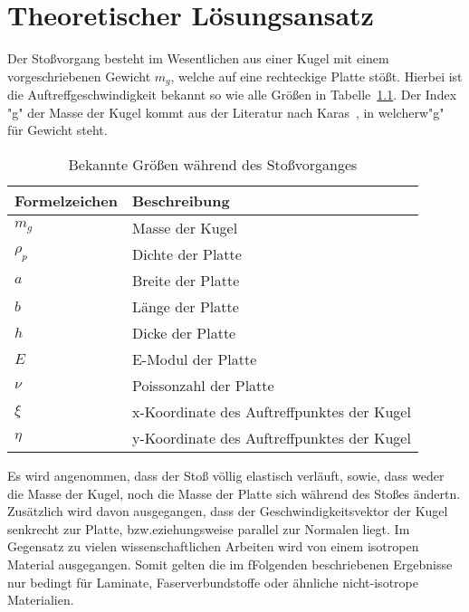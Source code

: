 \chapter{Theoretischer Lösungsansatz}
\label{chap:Principles}

Der Stoßvorgang besteht im Wesentlichen aus einer Kugel mit einem vorgeschriebenen Gewicht $m_g$, welche auf eine rechteckige Platte stößt. Hierbei ist die Auftreffgeschwindigkeit bekannt so wie alle Größen in Tabelle~\ref{tab:TheorieVariablen}. Der Index "g" der Masse der Kugel kommt aus der Literatur nach Karas~\cite{Karas.1939}, in welcherw"g" für Gewicht steht. 

\begin{table}[h!]
	\begin{center}
		\caption{Bekannte Größen während des Stoßvorganges}
		\label{tab:TheorieVariablen}
		
		\begin{tabular}[h]{l | l}	
			Formelzeichen & Beschreibung \\
			\hline
			$m_g$ & Masse der Kugel \\
			$\rho_p$ & Dichte der Platte\\
			$a$ & Breite der Platte\\
			$b$ & Länge der Platte\\
			$h$ & Dicke der Platte \\
			$E$ & E-Modul der Platte \\
			$\nu$ & Poissonzahl der Platte \\
			$\xi$ & x-Koordinate des Auftreffpunktes der Kugel \\
			$\eta$ & y-Koordinate des Auftreffpunktes der Kugel \\
		\end{tabular}
		
	\end{center}
\end{table}


Es wird angenommen, dass der Stoß völlig elastisch verläuft, sowie, dass weder die Masse der Kugel, noch die Masse der Platte sich während des Stoßes ändertn.
Zusätzlich wird davon ausgegangen, dass der Geschwindigkeitsvektor der Kugel senkrecht zur Platte, bzw.eziehungsweise  parallel zur Normalen liegt. Im Gegensatz zu vielen wissenschaftlichen Arbeiten wird von einem isotropen Material ausgegangen. Somit gelten die im fFolgenden beschriebenen Ergebnisse nur bedingt für Laminate, Faserverbundstoffe oder ähnliche nicht-isotrope Materialien. 

